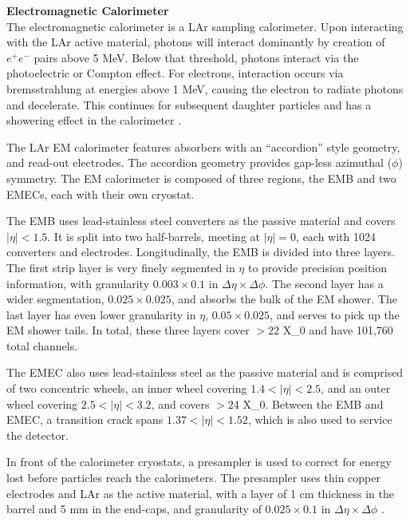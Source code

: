 \noindent\textbf{Electromagnetic Calorimeter}\\
\indent The electromagnetic calorimeter is a \gls{LAr} sampling calorimeter. Upon interacting with the \gls{LAr} active material, photons will interact dominantly by creation of $e^+e^-$ pairs above 5 MeV. Below that threshold, photons interact via the photoelectric or Compton effect. For electrons, interaction occurs via bremsstrahlung at energies above 1 MeV, causing the electron to radiate photons and decelerate. This continues for subsequent daughter particles and has a showering effect in the calorimeter \cite{detectors-for-radiation}.

The \gls{LAr} \gls{EM} calorimeter features absorbers with an ``accordion'' style geometry, and read-out electrodes. The accordion geometry provides gap-less azimuthal ($\phi$) symmetry. The \gls{EM} calorimeter is composed of three regions, the \gls{EMB} and two \glspl{EMEC}, each with their own cryostat.

The \gls{EMB} uses lead-stainless steel converters as the passive material and covers $|\eta| < 1.5$. It is split into two half-barrels, meeting at $|\eta| = 0$, each with 1024 converters and electrodes. Longitudinally, the \gls{EMB} is divided into three layers. The first strip layer is very finely segmented in $\eta$ to provide precision position information, with granularity $0.003 \times 0.1$ in $\Delta\eta \times \Delta \phi$. The second layer has a wider segmentation, $0.025 \times 0.025$, and absorbs the bulk of the \gls{EM} shower. The last layer has even lower granularity in $\eta$, $0.05 \times 0.025$, and serves to pick up the \gls{EM} shower tails. In total, these three layers cover $>22$ \gls{X_0} and have 101,760 total channels.

The \gls{EMEC} also uses lead-stainless steel as the passive material and is comprised of two concentric wheels, an inner wheel covering $1.4 < |\eta| < 2.5$, and an outer wheel covering $2.5 < |\eta| < 3.2$, and covers $>24$ \gls{X_0}. Between the \gls{EMB} and \gls{EMEC}, a transition crack spans $1.37 < |\eta| < 1.52$, which is also used to service the detector.

In front of the calorimeter cryostats, a presampler is used to correct for energy lost before particles reach the calorimeters. The presampler uses thin copper electrodes and \gls{LAr} as the active material, with a layer of 1 cm thickness in the barrel and 5 mm in the end-caps, and granularity of $0.025 \times 0.1$ in $\Delta\eta \times \Delta \phi$ \cite{lar-tdr}.


